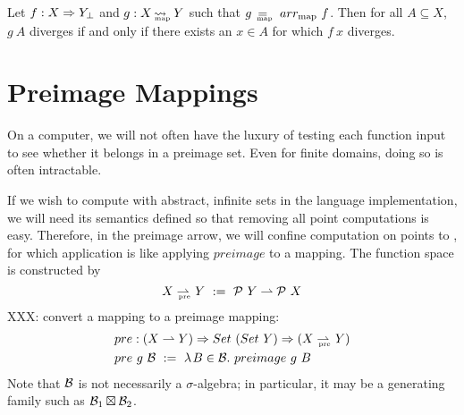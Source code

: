 \documentclass[preprint]{sigplanconf}
\newcommand{\pto}{\rightharpoonup}
\newcommand{\arrowarr}{\ensuremath{arr}}
\newcommand{\map}{_\mathrm{map}}
\DeclareMathOperator{\mapto}{\rightsquigarrow_{\mspace{-21mu}\map}}
\DeclareMathOperator{\eqmap}{\mbox{\ensuremath{=_{\mspace{-19mu}\map}}}}
\newcommand{\arrmap}{\arrowarr\map}
\newcommand{\pre}{_\mathrm{pre}}
\newcommand{\prepto}{\pto_{\mspace{-19mu}\pre}}
\begin{document}
\begin{corollary}
Let $f : X \Rightarrow Y_\bot$ and $g : X \mapto Y$ such that $g \ \eqmap \ \arrmap~f$.
Then for all $A \subseteq X$, $g~A$ diverges if and only if there exists an $x \in A$ for which $f~x$ diverges.
\end{corollary}



\section{Preimage Mappings}

On a computer, we will not often have the luxury of testing each function input to see whether it belongs in a preimage set.
Even for finite domains, doing so is often intractable.

If we wish to compute with abstract, infinite sets in the language implementation, we will need its semantics defined so that removing all point computations is easy.
Therefore, in the preimage arrow, we will confine computation on points to , for which application is like applying $preimage$ to a mapping.
The function space is constructed by
\begin{equation}
	X \prepto Y \ := \ \powerset~Y \pto \powerset~X
\end{equation}
XXX: convert a mapping to a preimage mapping:
\begin{equation}
\begin{aligned}
	&pre : (X \pto Y) \tto Set~(Set~Y) \tto (X \prepto Y) \\
	&pre~g~\B \ := \ \fun{B \in \B}{preimage~g~B}
\end{aligned}
\end{equation}
Note that $\mathcal{B}$ is not necessarily a $\sigma$-algebra; in particular, it may be a generating family such as $\mathcal{B}_1 \boxtimes \mathcal{B}_2$.
\end{document}
